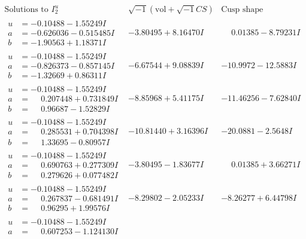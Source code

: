\documentclass[1p]{elsarticle_modified}
\theoremstyle{definition}
\newcommand{\I}{\sqrt{-1}}
\begin{document}
$$\begin{array}{c|c|c}
\text{Solutions to }I^u_{2}& \I (\text{vol} + \sqrt{-1}CS) & \text{Cusp shape}\\
 \hline 
\begin{aligned}
u &= -0.10488 - 1.55249 I \\
a &= -0.626036 - 0.515485 I \\
b &= -1.90563 + 1.18371 I\end{aligned}
 & -3.80495 + 8.16470 I & \phantom{-}0.01385 - 8.79231 I \\ \hline\begin{aligned}
u &= -0.10488 - 1.55249 I \\
a &= -0.826373 - 0.857145 I \\
b &= -1.32669 + 0.86311 I\end{aligned}
 & -6.67544 + 9.08839 I & -10.9972 - 12.5883 I \\ \hline\begin{aligned}
u &= -0.10488 - 1.55249 I \\
a &= \phantom{-}0.207448 + 0.731849 I \\
b &= \phantom{-}0.96687 - 1.52829 I\end{aligned}
 & -8.85968 + 5.41175 I & -11.46256 - 7.62840 I \\ \hline\begin{aligned}
u &= -0.10488 - 1.55249 I \\
a &= \phantom{-}0.285531 + 0.704398 I \\
b &= \phantom{-}1.33695 - 0.80957 I\end{aligned}
 & -10.81440 + 3.16396 I & -20.0881 - 2.5648 I \\ \hline\begin{aligned}
u &= -0.10488 - 1.55249 I \\
a &= \phantom{-}0.690763 + 0.277309 I \\
b &= \phantom{-}0.279626 + 0.077482 I\end{aligned}
 & -3.80495 - 1.83677 I & \phantom{-}0.01385 + 3.66271 I \\ \hline\begin{aligned}
u &= -0.10488 - 1.55249 I \\
a &= \phantom{-}0.267837 - 0.681491 I \\
b &= \phantom{-}0.96295 + 1.99576 I\end{aligned}
 & -8.29802 - 2.05233 I & -8.26277 + 6.44798 I \\ \hline\begin{aligned}
u &= -0.10488 - 1.55249 I \\
a &= \phantom{-}0.607253 - 1.124130 I \\

\end{aligned}
\end{array}$$
\end{document}
